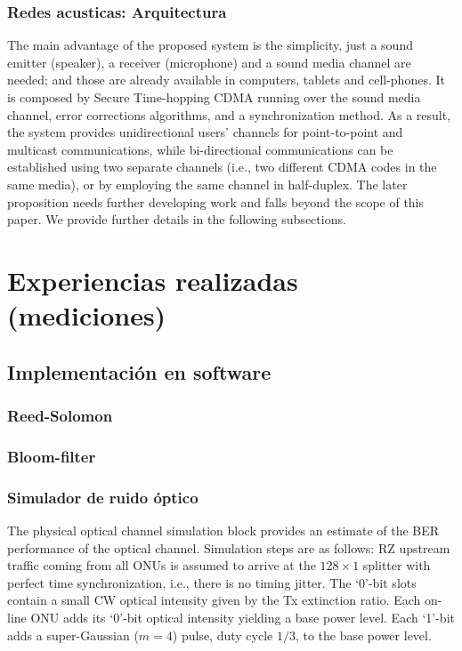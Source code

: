 \documentclass[a4paper,10pt]{report}
\begin{document}
\subsubsection{Redes acusticas: Arquitectura}
The main advantage of the proposed system is the simplicity, just a sound emitter (speaker), a receiver (microphone) and a sound media channel are needed; and those are already available in computers, tablets and cell-phones. It is composed by Secure Time-hopping CDMA running over the sound media channel, error corrections algorithms, and a synchronization method. As a result, the system provides unidirectional users’ channels for point-to-point and multicast communications, while bi-directional communications can be established using two separate channels (i.e., two different CDMA codes in the same media), or by employing the same channel in half-duplex. The later proposition needs further developing work and falls beyond the scope of this paper.
We provide further details in the following subsections.


\section{Experiencias realizadas (mediciones)}
\subsection{Implementación en software}
\subsubsection{Reed-Solomon}
\subsubsection{Bloom-filter}
\subsubsection{Simulador de ruido óptico}
The physical optical channel simulation block provides an estimate of
the BER performance of the optical channel. Simulation steps are as
follows: RZ upstream traffic coming from all ONUs is assumed to arrive
at the $128\times1$ splitter with perfect time synchronization, i.e., there is no timing jitter. 
The `0'-bit slots contain a small CW optical intensity given by the Tx extinction ratio. 
Each on-line ONU adds its `0'-bit optical intensity yielding a base power level.
Each `1'-bit adds a super-Gaussian ($m=4$) pulse, duty cycle $1/3$, to the base power level. %
 
\end{document}
